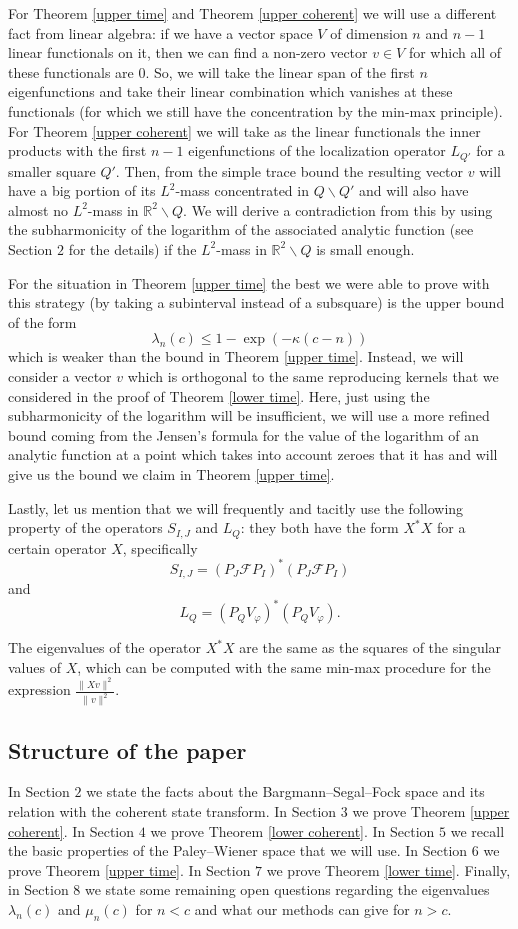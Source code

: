 \documentclass[12pt]{amsart}
\numberwithin{equation}{section}
\newcommand{\R}{\mathbb{R}}
\newcommand{\F}{\mathcal{F}}
\renewcommand{\phi}{\varphi}
\begin{document}
For Theorem \ref{upper time} and Theorem \ref{upper coherent} we will use a different fact from linear algebra: if we have a vector space $V$ of dimension $n$ and $n-1$ linear functionals on it, then we can find a non-zero vector $v\in V$ for which all of these functionals are $0$. So, we will take the linear span of the first $n$ eigenfunctions and take their linear combination which vanishes at these functionals (for which we still have the concentration by the min-max principle). For Theorem \ref{upper coherent} we will take as the linear functionals the inner products with the first $n-1$ eigenfunctions of the localization operator $L_{Q'}$ for a smaller square $Q'$. Then, from the simple trace bound the resulting vector $v$ will have a big portion of its $L^2$-mass concentrated in $Q\backslash Q'$ and will also have almost no $L^2$-mass in $\R^2\backslash Q$. We will derive a contradiction from this by using the subharmonicity of the logarithm of the associated analytic function (see Section $2$ for the details) if the $L^2$-mass in $\R^2\backslash Q$ is small enough.

For the situation in Theorem \ref{upper time} the best we were able to prove with this strategy (by taking a subinterval instead of a subsquare) is the upper bound of the form
$$\lambda_n(c) \le 1 -\exp(-\kappa (c-n))$$
which is weaker than the bound in Theorem \ref{upper time}. Instead, we will consider a vector $v$ which is orthogonal to the same reproducing kernels that we considered in the proof of Theorem \ref{lower time}. Here, just using the subharmonicity of the logarithm will be insufficient, we will use a more refined bound coming from the Jensen's formula for the value of the logarithm of an analytic function at a point which takes into account zeroes that it has and will give us the bound we claim in Theorem \ref{upper time}.

Lastly, let us mention that we will frequently and tacitly use the following property of the operators $S_{I, J}$ and $L_Q$: they both have the form $X^*X$ for a certain operator $X$, specifically $$S_{I, J} = (P_J\F P_I)^*(P_J\F P_I)$$
and 
$$L_Q = (P_Q V_\phi)^*(P_Q V_\phi).$$

The eigenvalues of the operator $X^* X$ are the same as the squares of the singular values of $X$, which can be computed with the same min-max procedure for the expression $\frac{\| Xv\|^2}{\|v\|^2}$.
\subsection{Structure of the paper} In Section $2$ we state the  facts about the Bargmann--Segal--Fock space and its relation with the coherent state transform. In Section $3$ we prove Theorem \ref{upper coherent}. In Section $4$ we prove Theorem \ref{lower coherent}. In Section $5$ we recall the basic properties of the Paley--Wiener space that we will use. In Section $6$ we prove Theorem \ref{upper time}. In Section $7$ we prove Theorem \ref{lower time}. Finally, in Section $8$ we state some remaining open questions regarding the eigenvalues $\lambda_n(c)$ and $\mu_n(c)$ for $n < c$ and what our methods can give for $n > c$.
\end{document}
